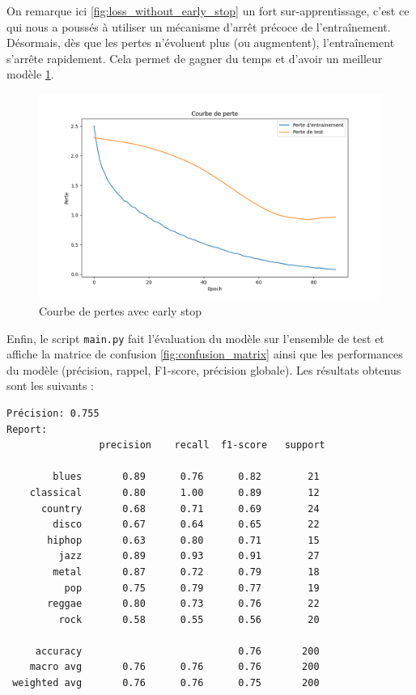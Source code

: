 \documentclass{article}
\begin{document}
On remarque ici \ref{fig:loss_without_early_stop} un fort sur-apprentissage, c'est ce qui nous a poussés à utiliser un mécanisme d'arrêt précoce de l'entraînement. Désormais, dès que les pertes n'évoluent plus (ou augmentent), l'entraînement s'arrête rapidement. Cela permet de gagner du temps et d'avoir un meilleur modèle \ref{fig:loss_with_early_stop}.

\begin{figure}[ht!]
    \centering
    \includegraphics[width=\textwidth]{img/loss_curve_with_early_stop.png}
    \caption{Courbe de pertes avec early stop}
    \label{fig:loss_with_early_stop}
\end{figure}

\newpage

Enfin, le script \texttt{main.py} fait l'évaluation du modèle sur l'ensemble de test et affiche la matrice de confusion \ref{fig:confusion_matrix} ainsi que les performances du modèle (précision, rappel, F1-score, précision globale). Les résultats obtenus sont les suivants :
\begin{verbatim}
Précision: 0.755
Report:
                precision    recall  f1-score   support
 
        blues       0.89      0.76      0.82        21
    classical       0.80      1.00      0.89        12
      country       0.68      0.71      0.69        24
        disco       0.67      0.64      0.65        22
       hiphop       0.63      0.80      0.71        15
         jazz       0.89      0.93      0.91        27
        metal       0.87      0.72      0.79        18
          pop       0.75      0.79      0.77        19
       reggae       0.80      0.73      0.76        22
         rock       0.58      0.55      0.56        20
 
     accuracy                           0.76       200
    macro avg       0.76      0.76      0.76       200
 weighted avg       0.76      0.76      0.75       200
\end{verbatim}
\end{document}
